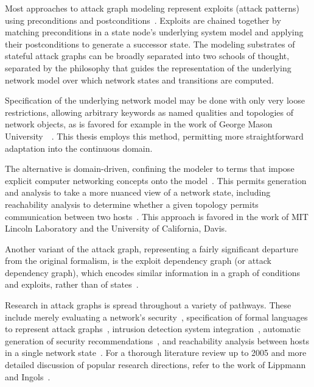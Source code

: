 Most approaches to attack graph modeling represent exploits (attack patterns) using
preconditions and postconditions~\cite{lippmann2005annotated, 
templeton2001requires}. Exploits are chained together by matching preconditions
in a state node's underlying system model and applying their postconditions to 
generate a successor state.
The modeling substrates of stateful attack graphs can be broadly separated into 
two schools of thought, separated by the philosophy that guides the representation of the underlying
network model over which network states and transitions are computed.

Specification of the underlying network model may be done with only very loose
restrictions, allowing arbitrary keywords as named qualities and topologies of 
network objects, as is favored for example in the work of George Mason 
University~\cite{ammann2002scalable}~\cite{wang2006minimum}.
This thesis employs this method, permitting more straightforward adaptation 
into the continuous domain.

The alternative is domain-driven, confining the modeler to
terms that impose explicit computer networking 
concepts onto the model~\cite{templeton2001requires}.
This permits generation and analysis to take a
more nuanced view of a network state, including reachability analysis to determine whether a
given topology permits communication between two hosts~\cite{ingols2009modeling}. This approach
is favored in the work of MIT Lincoln Laboratory and the University of California, Davis.

Another variant of the attack graph, representing a fairly significant departure
from the original formalism, is the exploit dependency graph (or attack
dependency graph), which encodes similar information in a graph of conditions
and exploits, rather than of states~\cite{jajodia2005topological, 
noel2004managing, louthan2011toward}.

Research in attack graphs is spread throughout a variety of pathways. These include
merely evaluating a network's security~\cite{ammann2002scalable}, specification of formal languages
to represent attack graphs~\cite{templeton2001requires}, intrusion detection system 
integration~\cite{tidwell2001modeling}, automatic generation of security recommendations~\cite{wang2006minimum},
and reachability analysis between hosts in a single network state~\cite{ingols2009modeling}. 
For a thorough literature review up to 2005 and more detailed discussion of popular research directions, 
refer to the work of Lippmann and Ingols~\cite{lippmann2005annotated}.

